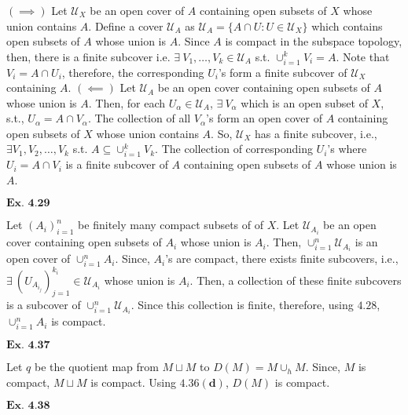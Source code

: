 \documentclass{article}
\begin{document}
$(\implies)$ Let $\mathcal{U}_X$ be an open cover of $A$ containing open subsets of $X$ whose union contains $A$. Define a cover $\mathcal{U}_A$ as $\mathcal{U}_{A} = \{A\cap U: U \in \mathcal{U}_X\}$ which contains open subsets of $A$ whose union is $A$. Since $A$ is compact in the subspace topology, then, there is a finite subcover i.e. $\exists\ V_1, \ldots, V_k \in \mathcal{U}_A$ s.t. $\cup_{i=1}^{k}V_i = A$. Note that $V_i = A \cap U_i$, therefore, the corresponding $U_i$'s form a finite subcover of $\mathcal{U}_X$ containing $A$. $(\impliedby)$ Let $\mathcal{U}_A$ be an open cover containing open subsets of $A$ whose union is $A$. Then, for each $U_\alpha \in \mathcal{U}_A$, $\exists\ V_\alpha$ which is an open subset of $X$, s.t., $U_\alpha = A \cap V_\alpha$. The collection of all $V_\alpha$'s form an open cover of $A$ containing open subsets of $X$ whose union contains $A$. So, $\mathcal{U}_X$ has a finite subcover, i.e., $\exists V_1, V_2, \ldots, V_k$ s.t. $A \subseteq \cup_{i=1}^{k}V_k$. The collection of corresponding $U_i$'s where $U_i = A \cap V_i$ is a finite subcover of $A$ containing open subsets of $A$ whose union is $A$.

\vspace{0.2in}

${\textbf{Ex. 4.29}}$

Let $(A_i)_{i=1}^{n}$ be finitely many compact subsets of of $X$. Let $\mathcal{U}_{A_i}$ be an open cover containing open subsets of $A_i$ whose union is $A_i$. Then, $\cup_{i=1}^{n}\mathcal{U}_{A_i}$ is an open cover of $\cup_{i=1}^{n}A_i$. Since, $A_i$'s are compact, there exists finite subcovers, i.e., $\exists\ (U_{A_{i_j}})_{j=1}^{k_i} \in \mathcal{U}_{A_i}$ whose union is $A_i$. Then, a collection of these finite subcovers is a subcover of $\cup_{i=1}^{n}\mathcal{U}_{A_i}$. Since this collection is finite, therefore, using $\mathbf{4.28}$, $\cup_{i=1}^{n}A_i$ is compact.

\vspace{0.2in}

${\textbf{Ex. 4.37}}$

Let $q$ be the quotient map from $M\sqcup M$ to $D(M) = M \cup_{h} M$. Since, $M$ is compact, $M \sqcup M$ is compact. Using $\mathbf{4.36(d)}$, $D(M)$ is compact.

\vspace{0.2in}

${\textbf{Ex. 4.38}}$
\end{document}
